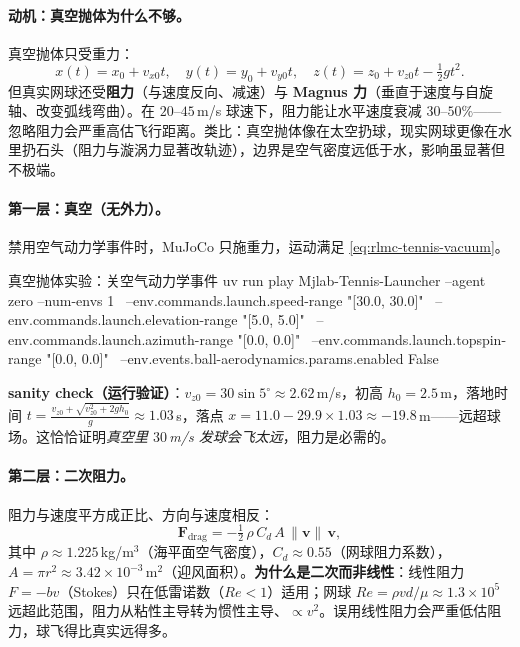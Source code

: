\paragraph{动机：真空抛体为什么不够。}真空抛体只受重力：
\begin{equation}
x(t)=x_0+v_{x0}t,\quad y(t)=y_0+v_{y0}t,\quad z(t)=z_0+v_{z0}t-\tfrac12 g t^2.
\label{eq:rlmc-tennis-vacuum}
\end{equation}
但真实网球还受\textbf{阻力}（与速度反向、减速）与 \textbf{Magnus 力}（垂直于速度与自旋轴、改变弧线弯曲）。在 $20$--$45$\,m/s 球速下，阻力能让水平速度衰减 $30$--$50\%$——忽略阻力会严重高估飞行距离。类比：真空抛体像在太空扔球，现实网球更像在水里扔石头（阻力与漩涡力显著改轨迹），边界是空气密度远低于水，影响虽显著但不极端。

\paragraph{第一层：真空（无外力）。}禁用空气动力学事件时，MuJoCo 只施重力，运动满足 \eqref{eq:rlmc-tennis-vacuum}。

\begin{codebox}[bash]{真空抛体实验：关空气动力学事件}
uv run play Mjlab-Tennis-Launcher --agent zero --num-envs 1 \
  --env.commands.launch.speed-range "[30.0, 30.0]" \
  --env.commands.launch.elevation-range "[5.0, 5.0]" \
  --env.commands.launch.azimuth-range "[0.0, 0.0]" \
  --env.commands.launch.topspin-range "[0.0, 0.0]" \
  --env.events.ball-aerodynamics.params.enabled False
\end{codebox}

\textbf{sanity check（运行验证）}：$v_{z0}=30\sin5^\circ\approx2.62$\,m/s，初高 $h_0=2.5$\,m，落地时间 $t=\frac{v_{z0}+\sqrt{v_{z0}^2+2gh_0}}{g}\approx1.03$\,s，落点 $x=11.0-29.9\times1.03\approx-19.8$\,m——远超球场。这恰恰证明\emph{真空里 $30$\,m/s 发球会飞太远}，阻力是必需的。

\paragraph{第二层：二次阻力。}阻力与速度平方成正比、方向与速度相反：
\begin{equation}
\mathbf{F}_{\text{drag}}=-\tfrac12\,\rho\,C_d\,A\,\|\mathbf v\|\,\mathbf v,
\label{eq:rlmc-tennis-drag}
\end{equation}
其中 $\rho\approx1.225$\,kg/m$^3$（海平面空气密度），$C_d\approx0.55$（网球阻力系数），$A=\pi r^2\approx3.42\times10^{-3}$\,m$^2$（迎风面积）。\textbf{为什么是二次而非线性}：线性阻力 $F=-bv$（Stokes）只在低雷诺数（$Re<1$）适用；网球 $Re=\rho v d/\mu\approx1.3\times10^5$ 远超此范围，阻力从粘性主导转为惯性主导、$\propto v^2$。误用线性阻力会严重低估阻力，球飞得比真实远得多。


